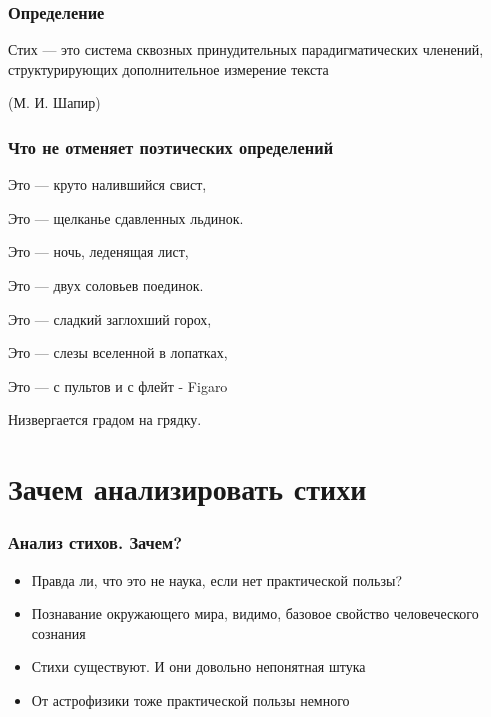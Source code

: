 \documentclass{beamer}
\begin{document}

\begin{frame}
\frametitle{Определение}

{\Large Стих — это система сквозных принудительных парадигматических членений, структурирующих дополнительное измерение текста}

\begin{flushleft}
(М. И. Шапир)
\end{flushleft}

\end{frame}


\begin{frame}
\frametitle{Что не отменяет поэтических определений}

\begin{flushleft}
Это — круто налившийся свист,

Это — щелканье сдавленных льдинок.

Это — ночь, леденящая лист,

Это — двух соловьев поединок.
\end{flushleft}

\begin{flushleft}
Это — сладкий заглохший горох,

Это — слезы вселенной в лопатках,

Это — с пультов и с флейт - Figaro

Низвергается градом на грядку.
\end{flushleft}

\end{frame}


\section{Зачем анализировать стихи}\label{sec:main}



\begin{frame}
\frametitle{Анализ стихов. Зачем?}

\begin{itemize}
\item Правда ли, что это не наука, если нет практической пользы?
\end{itemize}

\begin{itemize}
\item Познавание окружающего мира, видимо, базовое свойство человеческого сознания
\item Стихи существуют. И они довольно непонятная штука
\item От астрофизики тоже практической пользы немного
\end{itemize}

\end{frame}
\end{document}
